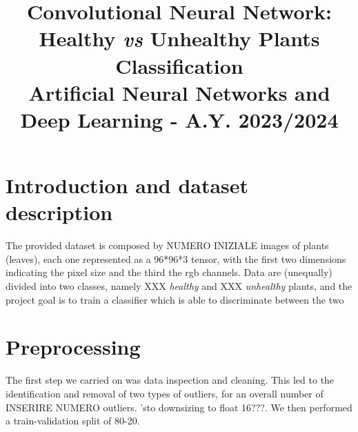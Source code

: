 \documentclass[conference,compsoc,11pt]{IEEEtran} %
\begin{document}
\title{Convolutional Neural Network:\\ Healthy \emph{vs} Unhealthy Plants Classification
\\ \large Artificial Neural Networks and Deep Learning - A.Y. 2023/2024}

\author{
}

\vspace{-0.3cm}

\maketitle


\IEEEpeerreviewmaketitle

\section{Introduction and dataset description}
\vspace{-0.3cm}

The provided dataset is composed by NUMERO INIZIALE images of plants (leaves), each one represented as a 96*96*3 tensor, with the first two dimensions indicating the pixel size and the third the rgb channels. Data are (unequally) divided into two classes, namely XXX \emph{healthy} and XXX \emph{unhealthy} plants, and the project goal is to train a classifier which is able to discriminate between the two \\


\section {Preprocessing}
\vspace{-0.3cm}
The first step we carried on was data inspection and cleaning. This led to the identification and removal of two types of outliers, for an overall number of INSERIRE NUMERO outliers. 'sto downsizing to float 16???. We then performed a train-validation split of 80-20. 
\end{document}
